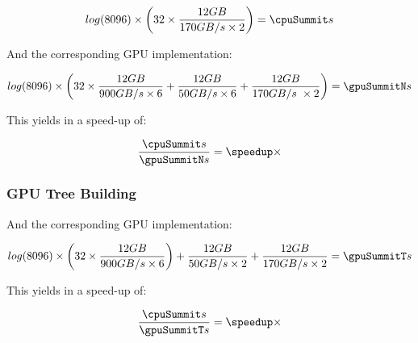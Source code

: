 \documentclass[]{article}
\begin{document}
\pgfmathsetmacro{}
\begin{center}
	\begin{equation}
		log(\d) \times \left ( \p \times \frac{ \s GB }{170 GB/s \times 2} \right ) = \cpuSummit s
	\end{equation}
\end{center}

And the corresponding GPU implementation:
\pgfmathsetmacro{}
\begin{center}
	\begin{equation}
		log(\d) \times \left ( \p \times \frac{\s GB}{900 GB/s \times 6} + \frac{\s GB}{50 GB/s \times 6}  + \frac{\s GB}{170 GB/s \ \times 2} \right )= \gpuSummitN s
	\end{equation}
\end{center}

This yields in a speed-up of:
\pgfmathsetmacro\speedup{\cpuSummit / \gpuSummitN}
\begin{center}
	\begin{equation}
		\frac{\cpuSummit s}{\gpuSummitN s} = \speedup \times 
	\end{equation}
\end{center}


\subsubsection{GPU Tree Building}

And the corresponding GPU implementation:
\pgfmathsetmacro{}
 
\begin{center}
	\begin{equation}
		log(\d) \times \left ( \p \times \frac{\s GB}{900 GB/s \times 6} \right ) + \frac{\s GB}{50 GB/s \times 2}  + \frac{\s GB}{170 GB/s \times 2} = \gpuSummitT s
	\end{equation}
\end{center}

This yields in a speed-up of:
\pgfmathsetmacro\speedup{\cpuSummit / \gpuSummitT}
\begin{center}
	\begin{equation}
		\frac{\cpuSummit s}{\gpuSummitT s} = \speedup \times
	\end{equation}
\end{center}
\end{document}
